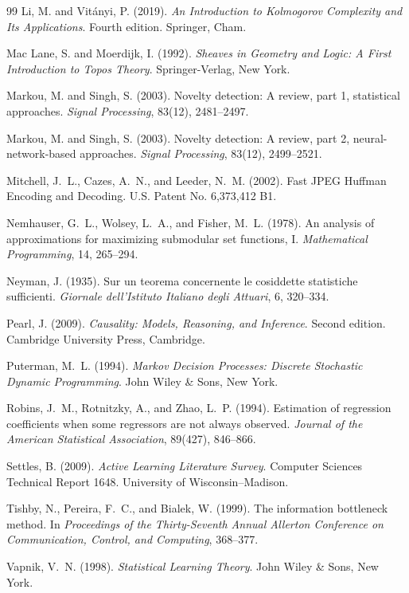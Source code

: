 \documentclass[11pt]{article}
\theoremstyle{definition}
\begin{document}
\begin{thebibliography}{99}
Li, M. and Vit\'anyi, P. (2019).
\textit{An Introduction to Kolmogorov Complexity and Its Applications}.
Fourth edition.
Springer, Cham.

Mac Lane, S. and Moerdijk, I. (1992).
\textit{Sheaves in Geometry and Logic: A First Introduction to Topos Theory}.
Springer-Verlag, New York.

Markou, M. and Singh, S. (2003).
Novelty detection: A review, part 1, statistical approaches.
\textit{Signal Processing}, 83(12), 2481--2497.

Markou, M. and Singh, S. (2003).
Novelty detection: A review, part 2, neural-network-based approaches.
\textit{Signal Processing}, 83(12), 2499--2521.

Mitchell, J.~L., Cazes, A.~N., and Leeder, N.~M. (2002).
Fast JPEG Huffman Encoding and Decoding.
U.S. Patent No. 6,373,412 B1.

Nemhauser, G.~L., Wolsey, L.~A., and Fisher, M.~L. (1978).
An analysis of approximations for maximizing submodular set functions, I.
\textit{Mathematical Programming}, 14, 265--294.

Neyman, J. (1935).
Sur un teorema concernente le cosiddette statistiche sufficienti.
\textit{Giornale dell'Istituto Italiano degli Attuari}, 6, 320--334.

Pearl, J. (2009).
\textit{Causality: Models, Reasoning, and Inference}.
Second edition.
Cambridge University Press, Cambridge.

Puterman, M.~L. (1994).
\textit{Markov Decision Processes: Discrete Stochastic Dynamic Programming}.
John Wiley \& Sons, New York.

Robins, J.~M., Rotnitzky, A., and Zhao, L.~P. (1994).
Estimation of regression coefficients when some regressors are not always observed.
\textit{Journal of the American Statistical Association}, 89(427), 846--866.

Settles, B. (2009).
\textit{Active Learning Literature Survey}.
Computer Sciences Technical Report 1648.
University of Wisconsin--Madison.

Tishby, N., Pereira, F.~C., and Bialek, W. (1999).
The information bottleneck method.
In \textit{Proceedings of the Thirty-Seventh Annual Allerton Conference on Communication, Control, and Computing}, 368--377.

Vapnik, V.~N. (1998).
\textit{Statistical Learning Theory}.
John Wiley \& Sons, New York.

\end{thebibliography}
\end{document}
